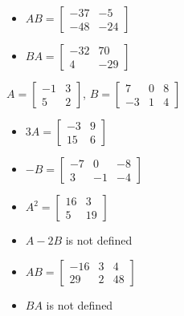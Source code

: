 \documentclass{ximera}
\begin{document}
\begin{question}
\begin{problem}
\begin{solution}
\begin{itemize}
\item $AB = \left[ \begin{array}{rr} -37 & -5 \\ -48 & -24 \end{array} \right]$

\item $BA = \left[ \begin{array}{rr} -32 & 70 \\ 4 & -29 \end{array} \right]$

\end{itemize}
\end{solution}
\end{problem} 

\begin{problem}
$A = \left[ \begin{array}{rr} -1 & 3 \\ 5 & 2 \end{array} \right]$, $B=\left[ \begin{array}{rrr} 7 & 0 & 8 \\ -3 & 1 & 4 \end{array} \right]$

\begin{solution}
\begin{itemize}
\item  $3A = \left[ \begin{array}{rr} -3 & 9 \\ 15 & 6\end{array} \right]$

\item $-B = \left[ \begin{array}{rrr} -7 & 0 & -8 \\ 3 & -1 & -4 \end{array} \right]$

\item $A^2 = \left[ \begin{array}{rr} 16 & 3 \\ 5 & 19 \end{array} \right]$

\item  $A-2B$ is not defined

\item $AB = \left[ \begin{array}{rrr} -16 & 3 & 4 \\ 29 & 2 & 48 \end{array} \right]$

\item $BA$ is not defined


\end{itemize}
\end{solution}
\end{problem}
\end{question}
\end{document}
